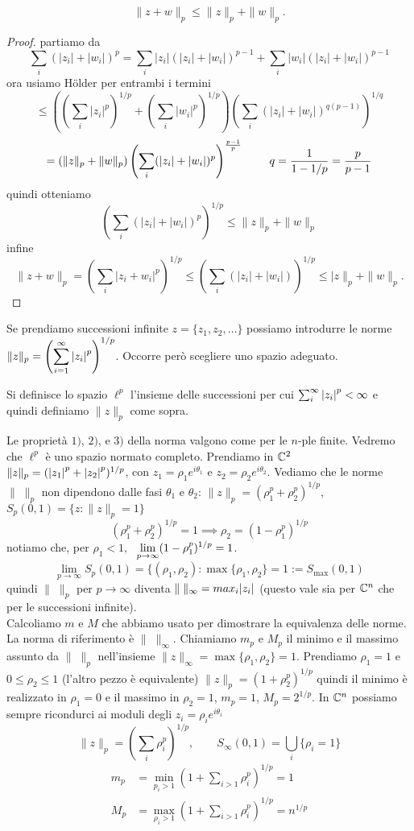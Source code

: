 \begin{theorem}
\[
\|z+w\|_p\leq \|z\|_p+\|w\|_p
.\]
\end{theorem}
\begin{proof}
partiamo da
\[\sum_i(|z_i|+|w_i|)^p=\sum_i|z_i|(|z_i|+|w_i|)^{p-1}+\sum_i|w_i|(|z_i|+|w_i|)^{p-1}\]
ora usiamo H\"{o}lder per entrambi i termini
\[\leq\left(\left(\sum_i|z_i|^p\right)^{1/p}+\left(\sum_i|w_i|^p\right)^{1/p}\right)\left(\sum_i(|z_i|+|w_i|)^{q(p-1)}\right)^{1/q}\]
\[=(\|z\|_p+\|w\|_p)\left(\sum_i(|z_i|+|w_i|)^p\right)^{\frac{p-1}{p}}\hspace{8mm} q=\frac{1}{1-1/p}=\frac{p}{p-1}\]
quindi otteniamo
\[\left(\sum_i(|z_i|+|w_i|)^p\right)^{1/p}\leq \|z\|_p+\|w\|_p\]
infine
\[
\|z+w\|_p=\left(\sum_i|z_i+w_i|^p\right)^{1/p}\leq \left(\sum_i(|z_i|+|w_i|)\right)^{1/p}\leq |z\|_p+\|w\|_p
.\]
\end{proof}

Se prendiamo successioni infinite $z = \{z_1, z_2, \ldots \}$ possiamo
introdurre le norme\\
$\displaystyle \|z\|_p = \left(\sum_{i=1}^\infty {\left|z_i\right|}^p\right)^{1/p}$.
Occorre però scegliere uno spazio adeguato. 

\begin{definition}
Si definisce lo spazio $\ell^p$ l'insieme delle successioni per cui
$\sum_i^{\infty} {\left|z_i\right|}^p < \infty$ e quindi definiamo $\|z\|_p$ come sopra.
\end{definition}
Le proprietà $1)$, $2)$, e $3)$ della norma valgono come per le $n$-ple
finite.
Vedremo che $\ell^p$ è uno spazio normato completo.
Prendiamo in $\mathbb C^2$ $\|z\|_p = ({\left|z_1\right|}^p + {\left|z_2\right|}^p)^{1/p}$,
con $z_1 = \rho_1 e^{i \theta_1}$ e $z_2 = \rho_2 e^{i \theta_2}$. Vediamo
che le norme $\| \; \|_p$ non dipendono dalle fasi $\theta_1$ e $\theta_2$:
$\|z\|_p = (\rho_1^p + \rho_2^p)^{1/p}$, $S_p(0,1) = \{z:\|z\|_p=1\}$
\[
(\rho_1^p + \rho_2^p)^{1/p} = 1 \implies \rho_2 = (1 - \rho_1^p)^{1/p}
\]
notiamo che, per $\rho_1 < 1, \;$ 
$\displaystyle \lim_{p \to \infty} (1 - \rho_1^p)^{1/p} = 1$.
\[
\lim_{p \to \infty} S_p(0, 1) = \{(\rho_1, \rho_2): \max \{\rho_1, \rho_2\} = 1
	:= S_{\max}(0, 1)
\]
quindi $\| \; \|_p$ per $p \to \infty$ diventa
$\| \; \|_{\infty} = max_i {\left|z_i\right|}$
(questo vale sia per $\mathbb C^n$ che per le successioni infinite).\\
Calcoliamo $m$ e $M$ che abbiamo usato per dimostrare la equivalenza
delle norme. La norma di riferimento è $\| \; \|_{\infty}$.
Chiamiamo $m_p$ e $M_p$ il minimo e il massimo assunto da $\| \; \|_p$
nell'insieme $\|z\|_{\infty} = \max \{\rho_1, \rho_2\}=1$.
Prendiamo $\rho_1 = 1$ e $0 \leq \rho_2 \leq 1$ (l'altro pezzo è equivalente)
$\|z\|_p = (1 + \rho_2^p)^{1/p}$
quindi il minimo è realizzato in $\rho_1 = 0$ e il massimo in $\rho_2 = 1$,
$m_p = 1$, $M_p = 2^{1/p}$.
In $\mathbb C^n$ possiamo sempre ricondurci ai moduli degli 
$z_i = \rho_i e^{i \theta_i}$
\[
\|z\|_p = \left(\sum_i \rho_i^p\right)^{1/p}, \qquad S_{\infty}(0, 1) =
\bigcup_i \{\rho_i = 1\}
\]
\begin{align*}
m_p &= \min_{p_i > 1} (1 + \sum_{i>1} \rho_i^p)^{1/p} = 1 \\
M_p &= \max_{\rho_i > 1} \left(1 + \sum_{i>1} \rho_i^p\right)^{1/p} = n^{1/p}
\end{align*}
